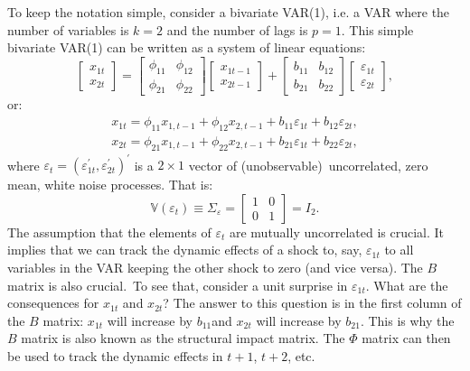 \documentclass[10pt]{article}
\begin{document}
To keep the notation simple, consider a bivariate VAR(1), i.e. a VAR where
the number of variables is $k=2$ and the number of lags is $p=1$. This
simple bivariate VAR(1) can be written as a system of linear equations:%
\begin{equation}
\begin{bmatrix}
x_{1t} \\ 
x_{2t}%
\end{bmatrix}%
=%
\begin{bmatrix}
\phi _{11} & \phi _{12} \\ 
\phi _{21} & \phi _{22}%
\end{bmatrix}%
\begin{bmatrix}
x_{1t-1} \\ 
x_{2t-1}%
\end{bmatrix}%
+%
\begin{bmatrix}
b_{11} & b_{12} \\ 
b_{21} & b_{22}%
\end{bmatrix}%
\begin{bmatrix}
\varepsilon _{1t} \\ 
\varepsilon _{2t}%
\end{bmatrix}%
,  \label{eq:struct_var_1}
\end{equation}%
or:%
\begin{equation}
\begin{array}{c}
x_{1t}=\phi _{11}x_{1,t-1}+\phi _{12}x_{2,t-1}+b_{11}\varepsilon
_{1t}+b_{12}\varepsilon _{2t}, \\ 
x_{2t}=\phi _{21}x_{1,t-1}+\phi _{22}x_{2,t-1}+b_{21}\varepsilon
_{1t}+b_{22}\varepsilon _{2t},%
\end{array}
\label{eq:struct_var_2}
\end{equation}%
where $\varepsilon _{t}=(\varepsilon _{1t}^{\prime },\varepsilon
_{2t}^{\prime })^{\prime }$ is a $2\times 1$ vector of (unobservable)\
uncorrelated, zero mean, white noise processes. That is:%
\begin{equation}
\mathbb{V}(\varepsilon _{t})\equiv \Sigma _{\varepsilon }=\left[ 
\begin{array}{cc}
1 & 0 \\ 
0 & 1%
\end{array}%
\right] =I_{2}.  \label{eq:struct_cov_1}
\end{equation}%
The assumption that the elements of $\varepsilon _{t}$ are mutually
uncorrelated is crucial. It implies that we can track the dynamic effects of
a shock to, say, $\varepsilon _{1t}$ to all variables in the VAR keeping the
other shock to zero (and vice versa). The $B$ matrix is also crucial.\ To
see that, consider a unit surprise in $\varepsilon _{1t}$. What are the
consequences for $x_{1t}$ and $x_{2t}$? The answer to this question is in
the first column of the $B$ matrix: $x_{1t}$ will increase by $b_{11}$and $%
x_{2t}$ will increase by $b_{21}$. This is why the $B$ matrix is also known
as the structural impact matrix. The $\Phi $ matrix can then be used to
track the dynamic effects in $t+1$, $t+2$, etc.
\end{document}
